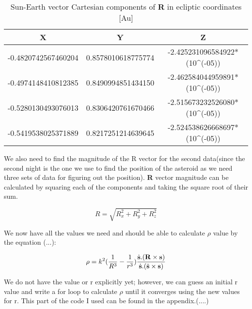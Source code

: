 \documentclass[letterpaper,12pt]{article}
\begin{document}
\FloatBarrier
\begin{table}[h!]
\caption{Sun-Earth vector Cartesian components of {\bf R} in ecliptic coordinates [Au]} %
\centering %
\begin{tabular}{c c c } %
\hline\hline %
X & Y & Z \\ [0.5ex] %
\hline %
-0.4820742567460204  & 0.8578010618775774  &  -2.425231096584922*(10^{(-05)})  \\
-0.4974148410812385  & 0.8490994851434150  &  -2.462584044959891*(10^{(-05)}) \\
-0.5280130493076013  & 0.8306420761670466  &  -2.515673232526080*(10^{(-05)}) \\ 
-0.5419538025371889  & 0.8217251214639645  &  -2.524538626668697*(10^{(-05)})  \\ [1ex] %
\hline %
\end{tabular}
\label{table:nonlin} %
\end{table}
\FloatBarrier




We also need to find the magnitude of the R vector for the second data(since the second night is the one we use to find the position of the asteroid as we need three sets of data for figuring out the position). {\bf R} vector magnitude can be calculated by squaring each of the components and taking the square root of their sum.

\begin{equation}
R=\sqrt{R_{x}^2+R_{y}^2+R_{z}^2}
\end{equation}


We now have all the values we need and should be able to calculate \begin{math} \rho \end{math} value by the equation (...):

\begin{equation}
\rho=k^2(\frac{1}{R^3}-\frac{1}{r^3})\frac{\dot{{\bf s}}.({\bf R}\times{\bf s})}{\dot{{\bf s}}.(\ddot{{\bf s}}\times{\bf s})}
\end{equation}

We do not have the value or r explicitly yet; however, we can guess an initial r value and write a for loop to calculate \begin{math} \rho \end{math} until it converges using the new values for r. This part of the code I used can be found in the appendix.(....)
\end{document}
